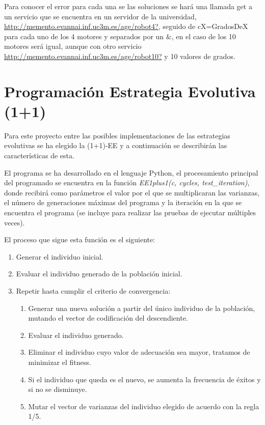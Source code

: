 \documentclass[12pt, spanish, pdftex]{UC3M_document}
\begin{document}
Para conocer el error para cada una se las soluciones se hará una llamada get a un servicio que se encuentra en un servidor de la universidad, \href{http://memento.evannai.inf.uc3m.es/age/robot4?}{http://memento.evannai.inf.uc3m.es/age/robot4?}, seguido de cX=GradosDeX para cada uno de los 4 motores y separados por un $\&$, en el caso de los 10 motores será igual, aunque con otro servicio \href{http://memento.evannai.inf.uc3m.es/age/robot10?}{http://memento.evannai.inf.uc3m.es/age/robot10?} y 10 valores de grados.

\section{Programación Estrategia Evolutiva (1+1)}
Para este proyecto entre las posibles implementaciones de las estrategias evolutivas se ha elegido la (1+1)-EE y a continuación se describirán las características de esta. 

El programa se ha desarrollado en el lenguaje Python, el procesamiento principal del programado se encuentra en la función \textit{EE1plus1(c, cycles, test\_iteration)}, donde recibirá como parámetros el valor por el que se multiplicaran las varianzas, el número de generaciones máximas del programa y la iteración en la que se encuentra el programa (se incluye para realizar las pruebas de ejecutar múltiples veces).

El proceso que sigue esta función es el siguiente:
\begin{enumerate}
	\item Generar el individuo inicial.
	\item Evaluar el individuo generado de la población inicial.
	\item Repetir hasta cumplir el criterio de convergencia:
	      \begin{enumerate}
		      \item Generar una nueva solución a partir del único individuo de la población, mutando el vector de codificación del descendiente.
		      \item Evaluar el individuo generado.
		      \item Eliminar el individuo cuyo valor de adecuación sea mayor, tratamos de minimizar el fitness.
		      \item Si el individuo que queda es el nuevo, se aumenta la frecuencia de éxitos y si no se disminuye.
		      \item Mutar el vector de varianzas del individuo elegido de acuerdo con la regla 1/5.
	      \end{enumerate}
\end{enumerate}
\end{document}
